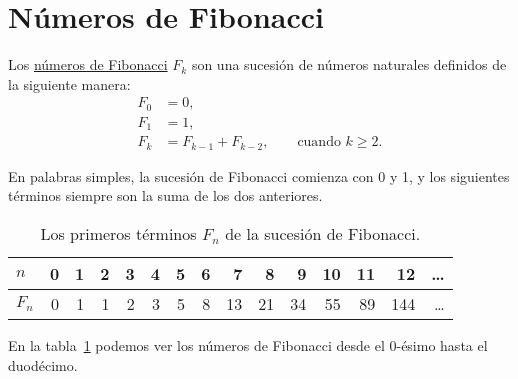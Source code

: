 \section{Números de Fibonacci}

Los
\href{http://es.wikipedia.org/wiki/N\%C3\%BAmeros\_de\_Fibonacci}{números
de Fibonacci} \(F_k\) son una sucesión de números naturales definidos de
la siguiente manera:
\begin{align*}
  F_0 &= 0, \\
  F_1 &= 1, \\
  F_k &= F_{k - 1} + F_{k - 2}, \qquad\text{cuando } k\ge 2.
\end{align*}

En palabras simples, la sucesión de Fibonacci comienza con 0 y 1, y los
siguientes términos siempre son la suma de los dos anteriores.

\begin{table}
  \begin{tabular}{l*{14}{r}}
    \toprule
    $n$   & 0 & 1 & 2 & 3 & 4 & 5 & 6 &  7 &  8 &  9 & 10 & 11 &  12 & \ldots{} \\
    \midrule
    $F_n$ & 0 & 1 & 1 & 2 & 3 & 5 & 8 & 13 & 21 & 34 & 55 & 89 & 144 & \ldots{} \\
    \bottomrule
  \end{tabular}
  \caption{Los primeros términos \(F_n\) de la sucesión de Fibonacci.}
  \label{tbl:fibonacci}
\end{table}

En la tabla~\ref{tbl:fibonacci} podemos ver los números de Fibonacci desde el
0-ésimo hasta el duodécimo.

